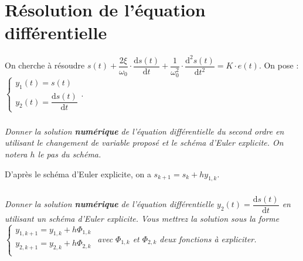 \documentclass[10pt,fleqn]{article} %
\begin{document}
\section{Résolution de l'équation différentielle}

On cherche à résoudre $
s(t)
+\dfrac{2\xi}{\omega_0}\cdot \dfrac{\text{d}s(t)}{\text{d}t}
+\dfrac{1}{\omega_0^2}\cdot \dfrac{\text{d}^2s(t)}{\text{d}t^2}
= K\cdot e(t)
$.
On pose : 
$
\left\{ 
\begin{array}{l}
y_1(t)=s(t) \\
y_2(t)=\dfrac{\text{d}s(t)}{\text{d} t}
\end{array}
\right.
$.

\subparagraph{}
\textit{Donner la solution \textbf{numérique} de l'équation différentielle du second ordre en utilisant le changement de variable proposé et le schéma d'Euler explicite. On notera $h$ le pas du schéma.}


\ifprof
\begin{corrige}
D'après le schéma d'Euler explicite, on a $s_{k+1}=s_{k}+hy_{1,k}$. 
\end{corrige}
\else
\fi


\subparagraph{}
\textit{Donner la solution \textbf{numérique} de l'équation différentielle $y_2(t)=\dfrac{\text{d}s(t)}{\text{d} t}$ en utilisant un schéma d'Euler explicite. Vous mettrez la solution sous la forme
$ \left\{ 
\begin{array}{l}
y_{1,k+1}=y_{1,k}+h \Phi_{1,k} \\
y_{2,k+1}=y_{2,k}+h \Phi_{2,k} \\
\end{array}
\right.
$ avec $\Phi_{1,k}$ et $\Phi_{2,k}$ deux fonctions à expliciter.}
\end{document}
